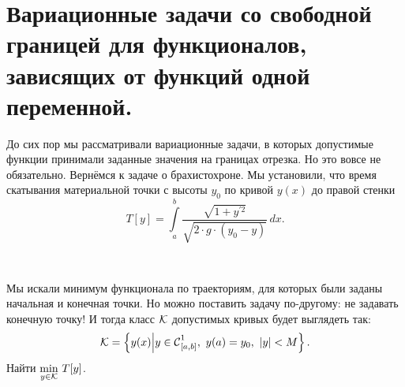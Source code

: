 \section[Задачи со свободными концами.]{Вариационные задачи со свободной границей для функционалов, зависящих от функций одной переменной.}
\label{lecture3section2}
До сих пор мы рассматривали вариационные задачи, в которых допустимые функции принимали заданные значения на границах отрезка. Но это вовсе не обязательно. Вернёмся к задаче о брахистохроне. Мы установили, что время скатывания материальной точки с высоты $y_0$ по кривой $y(x)$ до правой стенки 
\begin{equation*}
	 T[y]=\int\limits_a^b\frac{\sqrt{1+y^{\prime2}}}{\sqrt{2\cdot g\cdot(y_0-y)}}\,dx.
\end{equation*}
\begin{figure}[H]\centering
{} %

\caption{~}
\label{l3:fig:1}
\end{figure}
Мы искали минимум функционала по траекториям, для которых были заданы начальная и конечная точки. Но можно поставить задачу по-другому: не задавать конечную точку! И тогда класс $\mathcal{K}$ допустимых кривых будет выглядеть так:
\begin{equation*}
	\K=\left\{y(x)\middle|y\in\Cfn[{[a,b]}]{1},\ y(a)=y_0,\ |y|<M\right\}.
\end{equation*}
Найти $\displaystyle\min\limits_{y\in\mathcal{K}}\,T[y]$.

